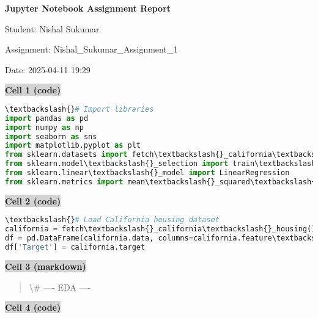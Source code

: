 \documentclass{article}
\begin{document}
\begin{center}
\Large\textbf{Jupyter Notebook Assignment Report}

\vspace{0.5cm}
\normalsize
Student: Nishal Sukumar

Assignment: Nishal_Sukumar_Assignment_1

Date: 2025-04-11 19:29
\end{center}

\vspace{1cm}


\vspace{0.5cm}
\noindent\colorbox{lightgray}{\textbf{Cell 1 (code)}}
\vspace{0.3cm}


\begin{lstlisting}[language=Python]
\textbackslash{}# Import libraries
import pandas as pd
import numpy as np
import seaborn as sns
import matplotlib.pyplot as plt
from sklearn.datasets import fetch\textbackslash{}_california\textbackslash{}_housing
from sklearn.model\textbackslash{}_selection import train\textbackslash{}_test\textbackslash{}_split
from sklearn.linear\textbackslash{}_model import LinearRegression
from sklearn.metrics import mean\textbackslash{}_squared\textbackslash{}_error, r2\textbackslash{}_score
\end{lstlisting}


\vspace{0.5cm}
\noindent\colorbox{lightgray}{\textbf{Cell 2 (code)}}
\vspace{0.3cm}


\begin{lstlisting}[language=Python]
\textbackslash{}# Load California housing dataset
california = fetch\textbackslash{}_california\textbackslash{}_housing()
df = pd.DataFrame(california.data, columns=california.feature\textbackslash{}_names)
df['Target'] = california.target
\end{lstlisting}


\vspace{0.5cm}
\noindent\colorbox{lightgray}{\textbf{Cell 3 (markdown)}}
\vspace{0.3cm}


\begin{quote}
\textbackslash{}# ---- EDA ----
\end{quote}


\vspace{0.5cm}
\noindent\colorbox{lightgray}{\textbf{Cell 4 (code)}}
\vspace{0.3cm}
\end{document}
